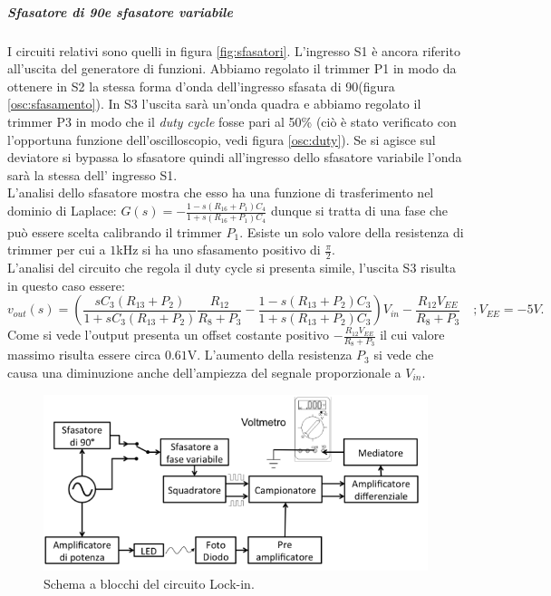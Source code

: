 \documentclass[10pt,a4paper]{article}
\begin{document}
\subparagraph{Sfasatore di 90\degree e sfasatore variabile}
I circuiti relativi sono quelli in figura \ref{fig:sfasatori}. L'ingresso S1 è ancora riferito all'uscita del generatore di funzioni. Abbiamo regolato il trimmer P1 in modo da ottenere in S2 la stessa forma d'onda dell'ingresso sfasata di 90\degree (figura \ref{osc:sfasamento}). In S3 l'uscita sarà un'onda quadra e abbiamo regolato il trimmer P3 in modo che il \emph{duty cycle} fosse pari al 50\% (ciò è stato verificato con l'opportuna funzione dell'oscilloscopio, vedi figura \ref{osc:duty}). Se si agisce sul deviatore si bypassa lo sfasatore quindi all'ingresso dello sfasatore variabile l'onda sarà la stessa dell' ingresso S1.\\
L'analisi dello sfasatore mostra che esso ha una funzione di trasferimento nel dominio di Laplace: $G(s) = -\frac{1-s(R_{16} +P_1) C_{4}}{1+s(R_{16} + P_1)C_{4}}$ dunque si tratta di una fase che può essere scelta calibrando il trimmer $P_1$. Esiste un solo valore della resistenza di trimmer per cui a $1$kHz si ha uno sfasamento positivo di $\frac{\pi}{2}$.\\
L'analisi del circuito che regola il duty cycle si presenta simile, l'uscita S3 risulta in questo caso essere:
\begin{equation}
v_{out}(s) = \left( \frac{s C_3 (R_{13} + P_2)}{1 + s C_3 (R_{13} + P_2)} \frac{R_{12}}{R_8+P_3} -\frac{1-s(R_{13} +P_2) C_{3}}{1+s(R_{13} + P_2)C_{3}} \right) V_{in}-\frac{R_{12} V_{EE}}{R_8+P_3}
\, \, \, \, \, \, ; V_{EE} = -5V.
\end{equation}
Come si vede l'output presenta un offset costante positivo $-\frac{R_{12} V_{EE}}{R_8+P_3}$ il cui valore massimo risulta essere circa $0.61$V. L'aumento della resistenza $P_3$ si vede che causa una diminuzione anche dell'ampiezza del segnale proporzionale a $V_{in}$. 

\begin{figure}[!htb]
  \centering
  \includegraphics[scale=0.75]{schemablocchi.png}
\caption{Schema a blocchi del circuito Lock-in.\label{fig:schemablocchi}}
\end{figure}
\end{document}
